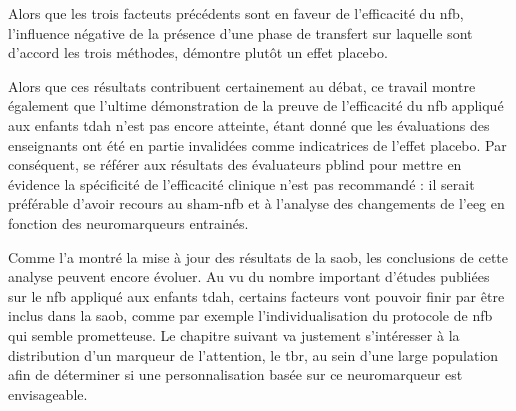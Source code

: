 Alors que les trois facteuts précédents sont en faveur de l'efficacité du \gls{nfb}, l'influence négative de la présence d'une phase de transfert sur laquelle sont d'accord les trois méthodes, 
démontre plutôt un effet placebo. 

Alors que ces résultats contribuent certainement au débat, ce travail montre également que l'ultime démonstration de la preuve de l'efficacité du \gls{nfb}
appliqué aux enfants \gls{tdah} n'est pas encore atteinte, étant donné que les évaluations des enseignants ont été en partie invalidées comme indicatrices de 
l'effet placebo. Par conséquent, se référer aux résultats des évaluateurs \gls{pblind} pour mettre en évidence la spécificité de l'efficacité clinique n'est pas 
recommandé : il serait préférable d'avoir recours au sham-\gls{nfb} et à l'analyse des changements de l'\gls{eeg} en fonction des neuromarqueurs entrainés.

Comme l'a montré la mise à jour des résultats de la \gls{saob}, les conclusions de cette analyse peuvent encore évoluer. Au vu du nombre important 
d'études publiées sur le \gls{nfb} appliqué aux enfants \gls{tdah}, certains facteurs vont pouvoir finir par être inclus dans la \gls{saob}, comme par exemple 
l'individualisation du protocole de \gls{nfb} qui semble prometteuse. Le chapitre suivant va justement s'intéresser à la distribution d'un marqueur de l'attention, 
le \gls{tbr}, au sein d'une large population afin de déterminer si une personnalisation basée sur ce neuromarqueur est envisageable.




 